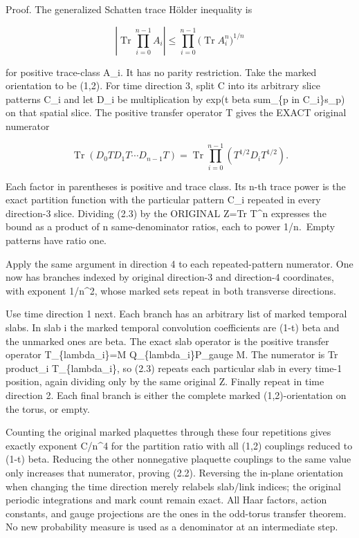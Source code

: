 \documentclass[
  11pt,
]{article}
\begin{document}
Proof. The generalized Schatten trace Hölder inequality is

\[
 \left|\operatorname{Tr}\prod_{i=0}^{n-1}A_i\right|
 \le\prod_{i=0}^{n-1}
        \bigl(\operatorname{Tr}A_i^n\bigr)^{1/n}
 \tag{2.3}
\]

for positive trace-class A\_i. It has no parity restriction. Take the
marked orientation to be (1,2). For time direction 3, split C into its
arbitrary slice patterns C\_i and let D\_i be multiplication by exp(t
beta sum\_\{p in C\_i\}s\_p) on that spatial slice. The positive
transfer operator T gives the EXACT original numerator

\[
 \operatorname{Tr}(D_0T D_1T\cdots D_{n-1}T)
 =\operatorname{Tr}\prod_{i=0}^{n-1}
               (T^{1/2}D_iT^{1/2}).
 \tag{2.4}
\]

Each factor in parentheses is positive and trace class. Its n-th trace
power is the exact partition function with the particular pattern C\_i
repeated in every direction-3 slice. Dividing (2.3) by the ORIGINAL Z=Tr
T\^{}n expresses the bound as a product of n same-denominator ratios,
each to power 1/n.~Empty patterns have ratio one.

Apply the same argument in direction 4 to each repeated-pattern
numerator. One now has branches indexed by original direction-3 and
direction-4 coordinates, with exponent 1/n\^{}2, whose marked sets
repeat in both transverse directions.

Use time direction 1 next. Each branch has an arbitrary list of marked
temporal slabs. In slab i the marked temporal convolution coefficients
are (1-t) beta and the unmarked ones are beta. The exact slab operator
is the positive transfer operator T\_\{lambda\_i\}=M
Q\_\{lambda\_i\}P\_gauge M. The numerator is Tr product\_i
T\_\{lambda\_i\}, so (2.3) repeats each particular slab in every time-1
position, again dividing only by the same original Z. Finally repeat in
time direction 2. Each final branch is either the complete marked
(1,2)-orientation on the torus, or empty.

Counting the original marked plaquettes through these four repetitions
gives exactly exponent \textbar C\textbar/n\^{}4 for the partition ratio
with all (1,2) couplings reduced to (1-t) beta. Reducing the other
nonnegative plaquette couplings to the same value only increases that
numerator, proving (2.2). Reversing the in-plane orientation when
changing the time direction merely relabels slab/link indices; the
original periodic integrations and mark count remain exact. All Haar
factors, action constants, and gauge projections are the ones in the odd-torus transfer theorem.
No new probability measure is used as a denominator at an intermediate
step.
\end{document}
